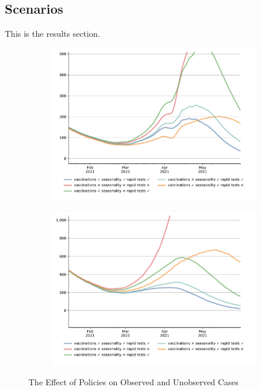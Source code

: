 \FloatBarrier


\subsection{Scenarios}
\label{subsec:appendix_scenarios}

This is the results section.



\begin{figure}[ht]
  \centering
  \begin{subfigure}{.6\textwidth}
    \includegraphics[width=0.9 \textwidth]{../figures/results/figures/scenario_comparisons/one_off_and_combined/full_new_known_case_cropped}
  \end{subfigure}%
  \begin{subfigure}{.6\textwidth}
    \includegraphics[width=0.9 \textwidth]{../figures/results/figures/scenario_comparisons/one_off_and_combined/full_newly_infected_cropped}
  \end{subfigure}
  \caption{The Effect of Policies on Observed and Unobserved Cases}
  \label{fig:explain_decline}
  \figurenotes{\ldots}
\end{figure}



